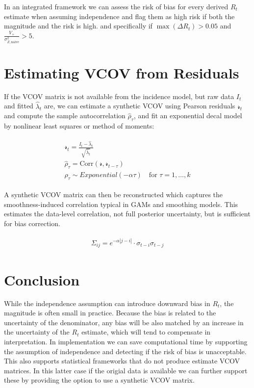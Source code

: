 \documentclass[a4paper, 12pt, twoside]{article}
\let\Oldsection\section
\renewcommand{\section}{\FloatBarrier\Oldsection}
\begin{document}
In an integrated framework we can assess the risk of bias for every derived $R_t$ estimate when assuming independence and flag them as high risk if both the magnitude and the risk is high. and specifically if $\max(\Delta R_t) > 0.05$ and $\frac{V_+}{\sigma_{Z,\text{naive}}^2} > 5$.

\section{Estimating VCOV from Residuals}

If the VCOV matrix is not available from the incidence model, but raw data $ I_t $ and fitted $ \hat{\lambda}_t $ are, we can estimate a synthetic VCOV using Pearson residuals $\mathcal{r}_t$ and compute the sample autocorrelation $ \hat{\rho}_\tau $, and fit an exponential decal model by nonlinear least squares or method of moments:

\begin{eqnarray}
\begin{aligned}
\mathcal{r}_t = \frac{I_t - \hat{\lambda}_t}{\sqrt{\hat{\lambda}_t}} \\
\hat{\rho}_\tau = \text{Corr}(\mathcal{r}, \mathcal{r}_{t-\tau}) \\
\rho_\tau \sim Exponential(-\alpha \tau)
\quad \text{for } \tau = 1, \dots, k
\end{aligned}
\end{eqnarray}

A synthetic VCOV matrix can then be reconstructed which captures the smoothness-induced correlation typical in GAMs and smoothing models. This estimates the data-level correlation, not full posterior uncertainty, but is sufficient for bias correction.

\begin{eqnarray}
\begin{aligned}
\Sigma_{ij} = e^{-\alpha |j-i|} \cdot \sigma_{t-i} \sigma_{t-j}
\end{aligned}
\end{eqnarray}

\section{Conclusion}

While the independence assumption can introduce downward bias in $ R_t $, the magnitude is often small in practice. Because the bias is related to the uncertainty of the denominator, any bias will be also matched by an increase in the uncertainty of the $R_t$ estimate, which will tend to compensate in interpretation. In implementation we can save computational time by supporting the assumption of independence and detecting if the risk of bias is unacceptable. This also supports statistical frameworks that do not produce estimate VCOV matrices. In this latter case if the origial data is available we can further support these by providing the option to use a synthetic VCOV matrix.


\end{document}
